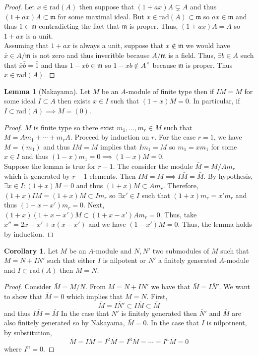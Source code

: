 \documentclass[12pt]{article}
\newcommand{\rad}[1]{\mathrm{rad}\left( #1 \right)}
\newcommand{\m}{\mathfrak{m}}
\theoremstyle{remark}
\theoremstyle{definition}
\newtheorem{lemma}[theorem]{Lemma}
\newtheorem{corollary}[theorem]{Corollary}
\begin{document}
\begin{proof}
Let $x \in \rad{A}$ then suppose that $(1 + ax) A \subsetneq A$ and thus $(1 + ax)A \subset \m$ for some maximal ideal. But $x \in \rad{A} \subset \m$ so $ax \in \m$ and thus $1 \in \m$ contradicting the fact that $\m$ is proper. Thus, $( 1 + a x) A = A$ so $1 + ax$ is a unit. 
\bigskip\\
Assuming that $1 + a x$ is always a unit, suppose that $x \notin \m$ we would have $\bar{x} \in A / \m$ is not zero and thus inveritble because $A / \m$ is a field. Thus, $\exists b \in A $ such that $\bar{x}\bar{b} = \bar{1}$ and thus $1 - xb \in \m$ so $1 - x b \notin A^\times$ because $\m$ is proper. Thus $x \in \rad{A}$. 
\end{proof}


\begin{lemma}[Nakayama]
Let $M$ be an $A$-module of finite type then if $I M = M$ for some ideal $I \subset A$ then exists $x \in I$ such that $(1 + x) M = 0$. In particular, if $I \subset \rad{A} \implies M = (0)$. 
\end{lemma}


\begin{proof}
$M$ is finite type so there exist $m_1, \dots, m_r \in M$ such that $M = A m_1 + \cdots + m_r A$. Proceed by induction on $r$. For the case $r = 1$, we have $M = (m_1)$ and thus $IM = M$ implies that $I m_1 = M$ so $m_1 = x m_1$ for some $x \in I$ and thus $(1 - x) m_1 = 0 \implies (1 - x) M = 0$. 
\bigskip\\
Suppose the lemma is true for $r-1$. The consider the module $\bar{M} = M / A m_r$ which is generated by $r-1$ elements. Then $IM = M \implies I \bar{M} = \bar{M}$. By hypothesis, $\exists x \in I : (1 + x) \bar{M} = 0$ and thus $(1 + x) M \subset A m_r$. Therefore, $(1 + x) IM = (1 + x) M \subset I m_r$ so $\exists x' \in I$ such that $(1 + x) m_r = x' m_r$ and thus $(1 + x - x') m_r = 0$.
Next, $(1 + x)(1 + x - x') M \subset (1 + x - x') A m_r = 0$. Thus, take $x'' = 2x - x' + x(x - x')$ and we have $(1 - x') M = 0$. Thus, the lemma holds by induction. 
\end{proof}

\begin{corollary}
Let $M$ be an $A$-module and $N,N'$ two submodules of $M$ such that $M = N + I N'$ such that either $I$ is nilpotent or $N'$ a finitely generated $A$-module and $I \subset \rad{A}$ then $M = N$. 
\end{corollary}

\begin{proof}
Consider $\bar{M} = M / N$. From $M = N + I N'$ we have that $\bar{M} = I \bar{N}'$. We want to show that $\bar{M} = 0$ which implies that $M = N$. First,
\[ \bar{M} = I \bar{N}' \subset I \bar{M} \subset \bar{M} \]
and thus $I \bar{M} = \bar{M}$
In the case that $N'$ is finitely generated then $\bar{N}'$ and $\bar{M}$ are also finitely generated so by Nakayama, $\bar{M} = 0$. In the case that $I$ is nilpotnent, by substitution,
\[ \bar{M} = I \bar{M} = I^2 \bar{M} = I^3 \bar{M} = \cdots = I^n \bar{M} = 0 \]   
where $I^n = 0$.
\end{proof}
\end{document}
